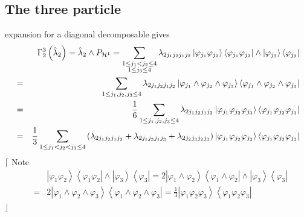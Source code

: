 \documentclass[12pt]{article}
\begin{document}
\subsection{The three particle}

expansion for a diagonal decomposable gives 
\begin{eqnarray*}
&&\Gamma _{2}^{3}\left( \hat{\lambda}_{2}\right) =\hat{\lambda}_{2}\wedge P_{%
\mathcal{H}^{1}}=\sum_{\substack{ 1\leq j_{1}<j_{2}\leq 4 \\ 1\leq j_{3}\leq
4}}\lambda _{2j_{1}j_{2}j_{1}j_{2}}\left\vert \varphi _{j_{1}}\varphi
_{j_{2}}\right\rangle \left\langle \varphi _{j_{1}}\varphi
_{j_{2}}\right\vert \wedge \left\vert \varphi _{j_{3}}\right\rangle
\left\langle \varphi _{j_{3}}\right\vert  \\
&=&\sum_{1\leq j_{1},j_{2},j_{3}\leq 4}\lambda
_{2j_{1}j_{2}j_{1}j_{2}}\left\vert \varphi _{j_{1}}\wedge \varphi
_{j_{2}}\wedge \varphi _{j_{3}}\right\rangle \left\langle \varphi
_{j_{1}}\wedge \varphi _{j_{2}}\wedge \varphi _{j_{3}}\right\vert  \\
&=&\frac{1}{6}\sum_{1\leq j_{1},j_{2},j_{3}\leq 4}\lambda
_{2j_{1}j_{2}j_{1}j_{2}}\left\vert \varphi _{j_{1}}\varphi _{j_{2}}\varphi
_{j_{3}}\right\rangle \left\langle \varphi _{j_{1}}\varphi _{j_{2}}\varphi
_{j_{3}}\right\vert  \\
&=&\frac{1}{3}\sum_{1\leq j_{1}<j_{2}<j_{3}\leq 4}\left( \lambda
_{2j_{1}j_{2}j_{1}j_{2}}+\lambda _{2j_{1}j_{3}j_{1}j_{3}}+\lambda
_{2j_{2}j_{3}j_{2}j_{3}}\right) \left\vert \varphi _{j_{1}}\varphi
_{j_{2}}\varphi _{j_{3}}\right\rangle \left\langle \varphi _{j_{1}}\varphi
_{j_{2}}\varphi _{j_{3}}\right\vert 
\end{eqnarray*}%
$\lceil $ Note 
\begin{eqnarray*}
&&\left\vert \varphi _{1}\varphi _{2}\right\rangle \left\langle \varphi
_{1}\varphi _{2}\right\vert \wedge \left\vert \varphi _{3}\right\rangle
\left\langle \varphi _{3}\right\vert =2\left\vert \varphi _{1}\wedge \varphi
_{2}\right\rangle \left\langle \varphi _{1}\wedge \varphi _{2}\right\vert
\wedge \left\vert \varphi _{3}\right\rangle \left\langle \varphi
_{3}\right\vert  \\
&=&2\left\vert \varphi _{1}\wedge \varphi _{2}\wedge \varphi
_{3}\right\rangle \left\langle \varphi _{1}\wedge \varphi _{2}\wedge \varphi
_{3}\right\vert =\frac{1}{3}\left\vert \varphi _{1}\varphi _{2}\varphi
_{3}\right\rangle \left\langle \varphi _{1}\varphi _{2}\varphi
_{3}\right\vert 
\end{eqnarray*}%
$\rfloor $
\end{document}
